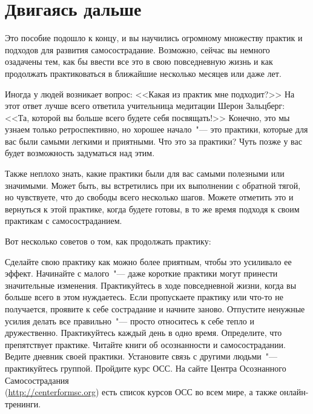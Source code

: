 
\chapter{Двигаясь дальше} \label{Taking_It_Forward}

Это пособие подошло к концу, и вы научились огромному множеству практик и подходов для развития самосострадание. Возможно, сейчас вы немного озадачены тем, как бы ввести все это в свою повседневную жизнь и как продолжать практиковаться в ближайшие несколько месяцев или даже лет. 

Иногда у людей возникает вопрос: <<Какая из практик мне подходит?>> На этот ответ лучше всего ответила учительница медитации  Шерон Зальцберг: <<Та, которой вы больше всего будете себя посвящать!>> Конечно, это мы узнаем только ретроспективно, но хорошее начало~"--- это практики, которые для вас были самыми легкими и приятными. Что это за практики? Чуть позже у вас будет возможность задуматься над этим.

Также неплохо знать, какие практики были для вас самыми полезными или значимыми. Может быть, вы встретились при их выполнении с обратной тягой, но чувствуете, что до свободы всего несколько шагов. Можете отметить это и вернуться к этой практике, когда будете готовы, в то же время подходя к своим практикам с самосостраданием.  

\vspace{2ex}

Вот несколько советов о том, как продолжать практику: 

\begin{itemize}
	\itemdiamondsuit Сделайте свою практику как можно более приятным, чтобы это усиливало ее эффект.
	\itemdiamondsuit Начинайте с малого~"--- даже короткие практики могут принести значительные изменения.
	\itemdiamondsuit Практикуйтесь в ходе повседневной жизни, когда вы больше всего в этом нуждаетесь.
	\itemdiamondsuit Если пропускаете практику или что-то не получается, проявите к себе сострадание и начните заново.
	\itemdiamondsuit Отпустите ненужные усилия делать все правильно~"--- просто относитесь к себе тепло и дружественно.
	\itemdiamondsuit Практикуйтесь каждый день в одно время.
	\itemdiamondsuit Определите, что препятствует практике.
	\itemdiamondsuit Читайте книги об осознанности и самосострадании.
	\itemdiamondsuit Ведите дневник своей практики.
	\itemdiamondsuit Установите связь с другими людьми~"--- практикуйтесь группой.
	\itemdiamondsuit Пройдите курс ОСС. На сайте Центра Осознанного Самосострадания\\ (\url{http://centerformsc.org}) есть список курсов ОСС во всем мире, а также онлайн-тренинги.
\end{itemize}


